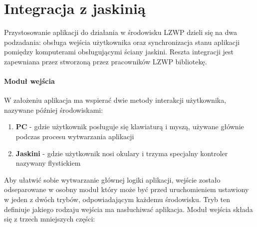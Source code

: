 \section{Integracja z jaskinią}
Przystosowanie aplikacji do działania w środowisku LZWP dzieli się na dwa podzadania: obsługa wejścia użytkownika oraz synchronizacja stanu aplikacji pomiędzy komputerami obsługującymi ściany jaskini. Reszta integracji jest zapewniana przez stworzoną przez pracowników LZWP bibliotekę.

\paragraph{Moduł wejścia}
W założeniu aplikacja ma wspierać dwie metody interakcji użytkownika, nazywane później środowiskami:
\begin{enumerate}[label=\textbullet]
	\item \textbf{PC} - gdzie użytkownik posługuje się klawiaturą i myszą, używane głównie podczas procesu wytwarzania aplikacji
	\item \textbf{Jaskini} - gdzie użytkownik nosi okulary i trzyma specjalny kontroler nazywany flystickiem
\end{enumerate}
Aby ułatwić sobie wytwarzanie głównej logiki aplikacji, wejście zostało odseparowane w osobny moduł który może być przed uruchomieniem ustawiony w jeden z dwóch trybów, odpowiadającym każdemu środowisku. Tryb ten definiuje jakiego rodzaju wejścia ma nasłuchiwać aplikacja. Moduł wejścia składa się z trzech mniejszych części:
